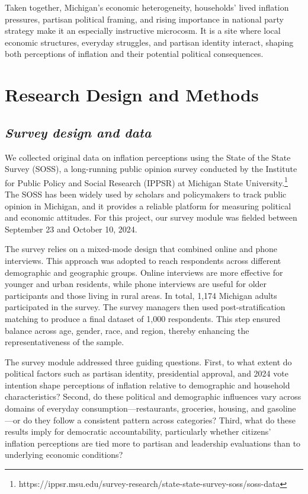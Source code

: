 \documentclass[]{interact}
\theoremstyle{plain}%
\theoremstyle{definition}
\theoremstyle{remark}
\begin{document}
Taken together, Michigan’s economic heterogeneity, households’ lived inflation pressures, partisan political framing, and rising importance in national party strategy make it an especially instructive microcosm. It is a site where local economic structures, everyday struggles, and partisan identity interact, shaping both perceptions of inflation and their potential political consequences.

\section*{Research Design and Methods}

\subsection*{\textit{Survey design and data}}

We collected original data on inflation perceptions using the State of the State Survey (SOSS), a long-running public opinion survey conducted by the Institute for Public Policy and Social Research (IPPSR) at Michigan State University.\footnote{https://ippsr.msu.edu/survey-research/state-state-survey-soss/soss-data} The SOSS has been widely used by scholars and policymakers to track public opinion in Michigan, and it provides a reliable platform for measuring political and economic attitudes. For this project, our survey module was fielded between September 23 and October 10, 2024.

The survey relies on a mixed-mode design that combined online and phone interviews. This approach was adopted to reach respondents across different demographic and geographic groups. Online interviews are more effective for younger and urban residents, while phone interviews are useful for older participants and those living in rural areas. In total, 1,174 Michigan adults participated in the survey. The survey managers then used post-stratification matching to produce a final dataset of 1,000 respondents. This step ensured balance across age, gender, race, and region, thereby enhancing the representativeness of the sample.

The survey module addressed three guiding questions. First, to what extent do political factors such as partisan identity, presidential approval, and 2024 vote intention shape perceptions of inflation relative to demographic and household characteristics? Second, do these political and demographic influences vary across domains of everyday consumption—restaurants, groceries, housing, and gasoline—or do they follow a consistent pattern across categories? Third, what do these results imply for democratic accountability, particularly whether citizens’ inflation perceptions are tied more to partisan and leadership evaluations than to underlying economic conditions?
\end{document}
